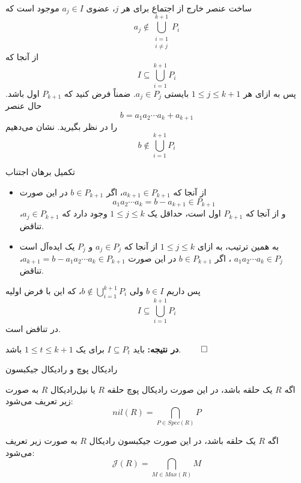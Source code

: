 \begin{frame}[t]{ساخت عنصر خارج از اجتماع}
    برای هر $j$، عضوی $a_j \in I$ موجود است که $$a_j \notin \bigcup_{\substack{i=1\\i \ne j}}^{k+1} P_i$$
    از آنجا که
    $$I \subseteq \bigcup_{i=1}^{k+1} P_i$$
    پس
    به ازای هر
    \(1 \le j \le k+1\)
    بایستی
    \(a_j \in P_j\). ضمناً فرض کنید که
    \(P_{k+1}\)
    اول باشد.
    حال عنصر
    \[
        b = a_1 a_2 \cdots a_k + a_{k+1}
    \]
    را در نظر بگیرید.
    نشان می‌دهیم
    $$b \notin \bigcup_{i=1}^{k+1} P_i$$

\end{frame}
\begin{frame}[t]{تکمیل برهان اجتناب}

    \begin{itemize}
        \item
              از آنجا که
              \(a_{k+1} \in P_{k+1}\)، اگر
              \(b\in P_{k+1}\)
              در این صورت
              \[a_1a_2\cdots a_k = b - a_{k+1} \in P_{k+1}\]
              و از آنجا که
              \(P_{k+1}\)
              اول است، حداقل یک
              $1 \le j \le k$
              وجود دارد که
              \(a_j \in P_{k+1}\)، تناقض.
        \item به همین ترتیب، به ازای \(1 \le j \le k\) از آنجا که
              \(a_{j} \in P_{j}\)
              و
              \( P_{j}\)
              یک ایده‌آل است
              \(a_1 a_2 \cdots a_k \in P_{j}\)
              ، اگر
              \(b\in P_{k+1}\)
              در این صورت
              \(a_{k+1}  = b - a_1a_2\cdots a_k  \in P_{k+1}\)، تناقض.
    \end{itemize}

    پس داریم $b \in I$ ولی $b \notin \bigcup_{i=1}^{k+1} P_i$، که این با فرض اولیه $$I \subseteq \bigcup_{i=1}^{k+1} P_i$$ در تناقض است.

    \bigskip
    \textbf{در نتیجه:} باید $I \subseteq P_t$ برای یک $1 \le t \le k+1$ باشد.
    \hfill
    \(\qed\)
\end{frame}
\begin{frame}[t]{رادیکال پوچ و رادیکال جیکبسون}
    \begin{definition}
        اگه $R$
        یک حلقه باشد، در این صورت
        رادیکال‌ پوچ
        حلقه
        $R$
        یا
        نیل‌رادیکال $R$
        به صورت زیر تعریف می‌شود:
        $$nil(R) = \bigcap_{P \in Spec(R)} P$$

    \end{definition}

    \begin{definition}
        اگه $R$
        یک حلقه باشد، در این صورت
        جیکبسون رادیکال $R$
        به صورت زیر تعریف می‌شود:
        $$\mathcal{J}(R) = \bigcap_{M \in Max(R)} M$$

    \end{definition}

\end{frame}


